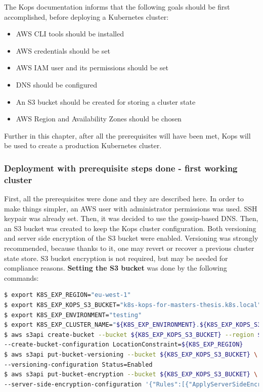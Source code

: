 The Kops documentation\cite{online-kops-aws} informs that the following goals should be first accomplished, before deploying a Kubernetes cluster:
\begin{itemize}
\item AWS CLI tools should be installed
\item AWS credentials should be set
\item AWS IAM user and its permissions should be set
\item DNS should be configured
\item An S3 bucket should be created for storing a cluster state
\item AWS Region and Availability Zones should be chosen
\end{itemize}

Further in this chapter, after all the prerequisites will have been met, Kops will be used to create a production Kubernetes cluster.

\subsubsection{Deployment with prerequisite steps done - first working cluster}

First, all the prerequisites were done and they are described here. In order to make things simpler, an AWS user with administrator permissions was used. SSH keypair was already set. Then, it was decided to use the gossip-based DNS. Then, an S3 bucket was created to keep the Kops cluster configuration. Both versioning and server side encryption of the S3 bucket were enabled. Versioning was strongly recommended, because thanks to it, one may revert or recover a previous cluster state store. S3 bucket encryption is not required, but may be needed for compliance reasons\cite{online-kops-aws}. \textbf{Setting the S3 bucket} was done by the following commands:
\begin{lstlisting}[basicstyle=\tiny,caption={Commands used to set an AWS S3 bucket for Kops},captionpos=b,language=Bash,xleftmargin=1cm]
$ export K8S_EXP_REGION="eu-west-1"
$ export K8S_EXP_KOPS_S3_BUCKET="k8s-kops-for-masters-thesis.k8s.local"
$ export K8S_EXP_ENVIRONMENT="testing"
$ export K8S_EXP_CLUSTER_NAME="${K8S_EXP_ENVIRONMENT}.${K8S_EXP_KOPS_S3_BUCKET}"
$ aws s3api create-bucket --bucket ${K8S_EXP_KOPS_S3_BUCKET} --region ${K8S_EXP_REGION} \
--create-bucket-configuration LocationConstraint=${K8S_EXP_REGION}
$ aws s3api put-bucket-versioning --bucket ${K8S_EXP_KOPS_S3_BUCKET} \
--versioning-configuration Status=Enabled
$ aws s3api put-bucket-encryption --bucket ${K8S_EXP_KOPS_S3_BUCKET} \
--server-side-encryption-configuration '{"Rules":[{"ApplyServerSideEncryptionByDefault":{"SSEAlgorithm":"AES256"}}]}'
\end{lstlisting}

